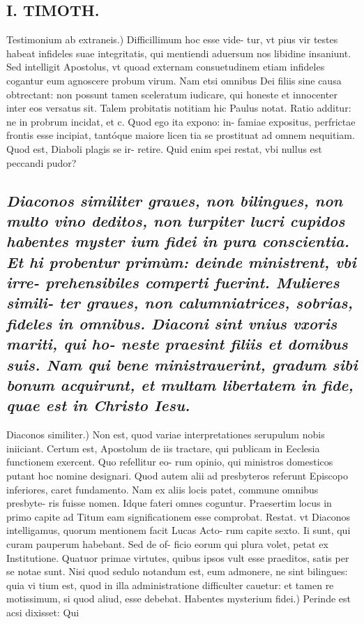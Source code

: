 \documentclass{article}
\begin{document}
\begin{pages}
\section*{I. TIMOTH. }
\marginpar{[ p.36 ]}\pstart Testimonium ab extraneis.) Difficillimum hoc esse vide- tur, vt pius vir testes habeat infideles suae integritatis, qui mentiendi aduersum nos libidine insaniunt. Sed intelligit Apostolus, vt quoad externam consuetudinem etiam infideles cogantur eum agnoscere probum virum. Nam etsi omnibus Dei filiis sine causa obtrectant: non possunt tamen sceleratum iudicare, qui honeste et innocenter inter eos versatus sit. Talem probitatis notitiam hic Paulus notat. Ratio additur: ne in probrum incidat, et c. Quod ego ita expono: in- famiae expositus, perfrictae frontis esse incipiat, tantóque maiore licen tia se prostituat ad omnem nequitiam. Quod est, Diaboli plagis se ir- retire. Quid enim spei restat, vbi nullus est peccandi pudor?  \pend
{}
{}
\subsection*{\textit{Diaconos similiter graues, non bilingues, non multo vino deditos, non turpiter lucri cupidos habentes myster ium fidei in pura conscientia. Et hi probentur primùm: deinde ministrent, vbi irre- prehensibiles comperti fuerint. Mulieres simili- ter graues, non calumniatrices, sobrias, fideles in omnibus. Diaconi sint vnius vxoris mariti, qui ho- neste praesint filiis et domibus suis. Nam qui bene ministrauerint, gradum sibi bonum acquirunt, et multam libertatem in fide, quae est in Christo Iesu. }}\pstart Diaconos similiter.) Non est, quod variae interpretationes serupulum nobis iniiciant. Certum est, Apostolum de iis tractare, qui publicam in Eeclesia functionem exercent. Quo refellitur eo- rum opinio, qui ministros domesticos putant hoc nomine designari. Quod autem alii ad presbyteros referunt Episcopo inferiores, caret fundamento. Nam ex aliis locis patet, commune omnibus presbyte- ris fuisse nomen. Idque fateri omnes coguntur. Praesertim locus in primo capite ad Titum eam significationem esse comprobat. Restat. vt Diaconos intelligamus, quorum mentionem facit Lucas Acto- rum capite sexto. Ii sunt, qui curam pauperum habebant. Sed de of- ficio eorum qui plura volet, petat ex Institutione. Quatuor primae virtutes, quibus ipsos vult esse praeditos, satis per se notae sunt. Nisi quod sedulo notandum est, eum admonere, ne sint bilingues: quia vi tium est, quod in illa administratione difficulter cauetur: et tamen re motissimum, si quod aliud, esse debebat.  \pend\pstart Habentes mysterium fidei.) Perinde est acsi dixisset: Qui  \pend

\end{pages}
\end{document}
